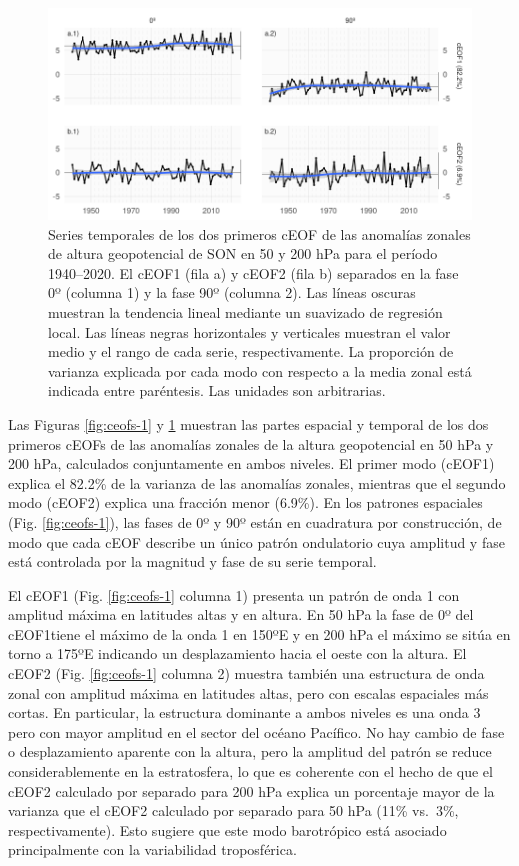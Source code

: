 \documentclass[12pt,oneside,a4paper]{reedthesis}
\begin{document}
\begin{figure}

{\centering \includegraphics{figures/20-ceofs/extended-series-1} 

}

\caption{Series temporales de los dos primeros cEOF de las anomalías zonales de altura geopotencial de SON en 50 y 200 hPa para el período 1940--2020. El cEOF1 (fila a) y cEOF2 (fila b) separados en la fase 0º (columna 1) y la fase 90º (columna 2). Las líneas oscuras muestran la tendencia lineal mediante un suavizado de regresión local. Las líneas negras horizontales y verticales muestran el valor medio y el rango de cada serie, respectivamente. La proporción de varianza explicada por cada modo con respecto a la media zonal está indicada entre paréntesis. Las unidades son arbitrarias.}\label{fig:extended-series}
\end{figure}

Las Figuras \ref{fig:ceofs-1} y \ref{fig:extended-series} muestran las partes espacial y temporal de los dos primeros cEOFs de las anomalías zonales de la altura geopotencial en 50 hPa y 200 hPa, calculados conjuntamente en ambos niveles.
El primer modo (cEOF1) explica el 82.2\% de la varianza de las anomalías zonales, mientras que el segundo modo (cEOF2) explica una fracción menor (6.9\%).
En los patrones espaciales (Fig. \ref{fig:ceofs-1}), las fases de 0º y 90º están en cuadratura por construcción, de modo que cada cEOF describe un único patrón ondulatorio cuya amplitud y fase está controlada por la magnitud y fase de su serie temporal.

El cEOF1 (Fig. \ref{fig:ceofs-1} columna 1) presenta un patrón de onda 1 con amplitud máxima en latitudes altas y en altura.
En 50 hPa la fase de 0º del cEOF1tiene el máximo de la onda 1 en 150ºE y en 200 hPa el máximo se sitúa en torno a 175ºE indicando un desplazamiento hacia el oeste con la altura.
El cEOF2 (Fig. \ref{fig:ceofs-1} columna 2) muestra también una estructura de onda zonal con amplitud máxima en latitudes altas, pero con escalas espaciales más cortas.
En particular, la estructura dominante a ambos niveles es una onda 3 pero con mayor amplitud en el sector del océano Pacífico.
No hay cambio de fase o desplazamiento aparente con la altura, pero la amplitud del patrón se reduce considerablemente en la estratosfera, lo que es coherente con el hecho de que el cEOF2 calculado por separado para 200 hPa explica un porcentaje mayor de la varianza que el cEOF2 calculado por separado para 50 hPa (11\% vs.~3\%, respectivamente).
Esto sugiere que este modo barotrópico está asociado principalmente con la variabilidad troposférica.
\end{document}
